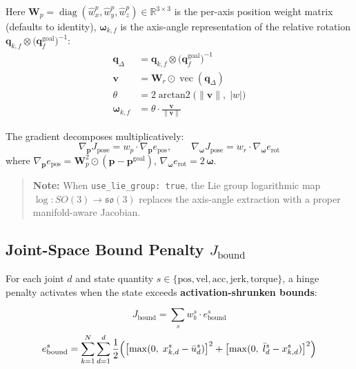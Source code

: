 \documentclass[11pt,a4paper]{article}
\begin{document}
Here $\mathbf{W}_p = \operatorname{diag}(\hat{w}_x^p, \hat{w}_y^p, \hat{w}_z^p) \in \mathbb{R}^{3 \times 3}$
is the per-axis position weight matrix (defaults to identity),
$\boldsymbol{\omega}_{k,f}$ is the axis-angle representation of the relative rotation
$\mathbf{q}_{k,f} \otimes \bigl(\mathbf{q}_f^{\text{goal}}\bigr)^{-1}$:
%
\begin{align*}
\mathbf{q}_{\Delta} &= \mathbf{q}_{k,f} \otimes \bigl(\mathbf{q}_f^{\text{goal}}\bigr)^{-1} \\
\mathbf{v} &= \mathbf{W}_r \odot \operatorname{vec}(\mathbf{q}_{\Delta}) \\
\theta &= 2 \operatorname{arctan2}\bigl(\lVert\mathbf{v}\rVert,\; |w|\bigr) \\
\boldsymbol{\omega}_{k,f} &= \theta \cdot \frac{\mathbf{v}}{\lVert\mathbf{v}\rVert}
\end{align*}

The gradient decomposes multiplicatively:
%
\begin{equation}
\nabla_{\mathbf{p}} J_{\text{pose}} = w_p \cdot \nabla_{\mathbf{p}} e_{\text{pos}},
\qquad
\nabla_{\boldsymbol{\omega}} J_{\text{pose}} = w_r \cdot \nabla_{\boldsymbol{\omega}} e_{\text{rot}}
\end{equation}
where $\nabla_{\mathbf{p}} e_{\text{pos}} = \mathbf{W}_p^2 \odot (\mathbf{p} - \mathbf{p}^{\text{goal}})$,
$\nabla_{\boldsymbol{\omega}} e_{\text{rot}} = 2\,\boldsymbol{\omega}$.

\begin{quote}
\textbf{Note:} When \texttt{use\_lie\_group: true}, the Lie group logarithmic map
$\log: SO(3) \to \mathfrak{so}(3)$ replaces the axis-angle extraction with
a proper manifold-aware Jacobian.
\end{quote}

\subsection{Joint-Space Bound Penalty $J_{\text{bound}}$}

For each joint $d$ and state quantity
$s \in \{\text{pos}, \text{vel}, \text{acc}, \text{jerk}, \text{torque}\}$,
a hinge penalty activates when the state exceeds \textbf{activation-shrunken bounds}:

\begin{equation}
J_{\text{bound}} = \sum_{s} w_b^s \cdot e_{\text{bound}}^s
\label{eq:bound}
\end{equation}
%
\begin{equation}
e_{\text{bound}}^s = \sum_{k=1}^{N} \sum_{d=1}^{d}
\frac{1}{2} \Bigl(
\bigl[\max(0,\; x_{k,d}^s - \bar{u}_d^s)\bigr]^2
+ \bigl[\max(0,\; \bar{l}_d^s - x_{k,d}^s)\bigr]^2
\Bigr)
\label{eq:ebound}
\end{equation}
\end{document}

